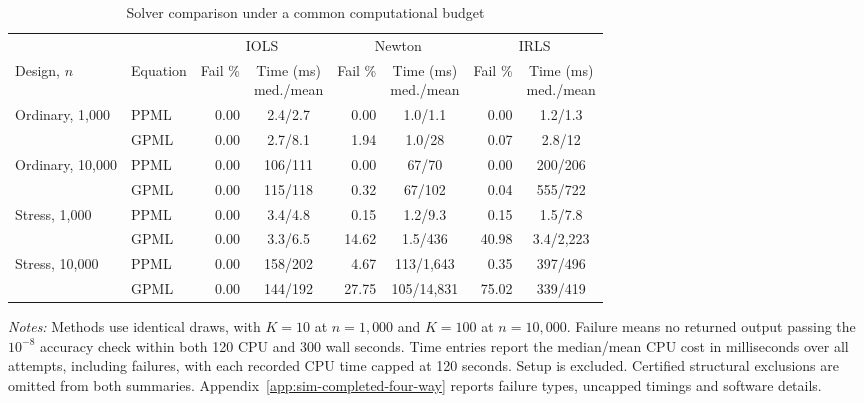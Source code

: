 \begin{table}[htbp]
\centering
\begin{singlespace}
\small
\caption{Solver comparison under a common computational budget}
\label{tab:solver-preliminary-main}
\setlength{\tabcolsep}{2pt}
\begin{tabular}{@{}llrcrcrc@{}}
\toprule
 & & \multicolumn{2}{c}{IOLS}
   & \multicolumn{2}{c}{Newton}
   & \multicolumn{2}{c}{IRLS}\\
\cmidrule(lr){3-4}\cmidrule(lr){5-6}\cmidrule(l){7-8}
Design, \(n\) & Equation
 & Fail \% & \shortstack{Time (ms)\\med./mean}
 & Fail \% & \shortstack{Time (ms)\\med./mean}
 & Fail \% & \shortstack{Time (ms)\\med./mean}\\
\midrule
Ordinary, 1,000 & PPML
 & 0.00 & 2.4/2.7
 & 0.00 & 1.0/1.1
 & 0.00 & 1.2/1.3\\
 & GPML
 & 0.00 & 2.7/8.1
 & 1.94 & 1.0/28
 & 0.07 & 2.8/12\\
\addlinespace[2pt]
Ordinary, 10,000 & PPML
 & 0.00 & 106/111
 & 0.00 & 67/70
 & 0.00 & 200/206\\
 & GPML
 & 0.00 & 115/118
 & 0.32 & 67/102
 & 0.04 & 555/722\\
\addlinespace[2pt]
Stress, 1,000 & PPML
 & 0.00 & 3.4/4.8
 & 0.15 & 1.2/9.3
 & 0.15 & 1.5/7.8\\
 & GPML
 & 0.00 & 3.3/6.5
 & 14.62 & 1.5/436
 & 40.98 & 3.4/2,223\\
\addlinespace[2pt]
Stress, 10,000 & PPML
 & 0.00 & 158/202
 & 4.67 & 113/1,643
 & 0.35 & 397/496\\
 & GPML
 & 0.00 & 144/192
 & 27.75 & 105/14,831
 & 75.02 & 339/419\\
\bottomrule
\end{tabular}

\smallskip
\begin{minipage}{\linewidth}
\footnotesize
\raggedright
\textit{Notes:}
Methods use identical draws, with \(K=10\) at \(n=1{,}000\)
and \(K=100\) at \(n=10{,}000\).
Failure means no returned output passing the \(10^{-8}\)
accuracy check within both 120 CPU and 300 wall seconds.
Time entries report the median/mean CPU cost in milliseconds
over all attempts, including failures, with each recorded CPU
time capped at 120 seconds. Setup is excluded.
Certified structural exclusions are omitted from both summaries.
Appendix~\ref{app:sim-completed-four-way} reports failure types,
uncapped timings and software details.
\end{minipage}
\end{singlespace}
\end{table}

